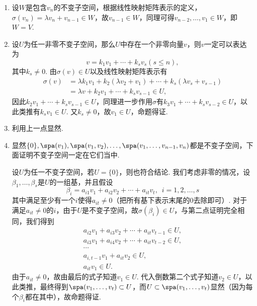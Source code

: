 \begin{solution}
    \begin{enumerate}
        \item 设$W$是包含$v_n$的不变子空间，根据线性映射矩阵表示的定义，$\sigma(v_n)=\lambda v_n+v_{n-1}\in W$，故$v_{n-1}\in W$，同理可得$v_{n-2},\ldots,v_1\in W$，即$W=V$.

        \item 设$U$为任一非零不变子空间，那么$U$中存在一个非零向量$v$，则$v$一定可以表达为
              \[v=k_1v_1+\cdots+k_sv_s(s\leqslant n),\]
              其中$k_s\neq 0$. 由$\sigma(v)\in U$以及线性映射矩阵表示有
              \begin{align*}
                  \sigma(v) & = \lambda k_1v_1+k_2(\lambda v_2+v_1)+\cdots+k_s(\lambda v_s+v_{s-1}) \\
                            & = \lambda v+k_2v_1+\cdots+k_sv_{s-1}\in U,
              \end{align*}
              因此$k_2v_1+\cdots+k_sv_{s-1}\in U$，同理进一步作用$\sigma$有$k_3v_1+\cdots+k_sv_{s-2}\in U$，以此类推有$k_sv_1\in U$. 又$k_s\neq 0$，故$v_1\in U$，命题得证.

        \item 利用上一点显然.

        \item 显然$\{0\},\spa(v_1),\spa(v_1,v_2),\ldots,\spa(v_1,\ldots,v_{n-1},v_n)$都是不变子空间，下面证明不变子空间一定在它们当中.

              设$U$为任一不变子空间，若$U=\{0\}$，则也符合结论. 我们考虑非零的情况，设$\beta_1,\ldots,\beta_s$是$U$的一组基，并且假设
              \[\beta_i=a_{i1}v_1+a_{i2}v_2+\cdots+a_{it}v_t,\enspace i=1,2,\ldots,s\]
              其中满足至少有一个$i$使得$a_{it}\neq 0$（把所有基下表示末尾的0去除即可）. 对于满足$a_{it}\neq 0$的$i$，由于$U$是不变子空间，故$\sigma(\beta_i)\in U$，与第二点证明完全相同，我们得到
              \begin{align*}
                  a_{i2}v_1+a_{i3}v_2+\cdots+a_{it}v_{t-1}\in U, \\
                  a_{i3}v_1+a_{i4}v_2+\cdots+a_{it}v_{t-2}\in U, \\
                  \cdots                                         \\
                  a_{i,t-1}v_1+a_{it}v_2\in U,                   \\
                  a_{it}v_1\in U.
              \end{align*}
              由于$a_{it}\neq 0$，故由最后的式子知道$v_1\in U$. 代入倒数第二个式子知道$v_2\in U$，以此类推，最终得到$\spa(v_1,\ldots,v_t)\subset U$，而$U\subset\spa(v_1,\ldots,v_t)$显然（因为每个$\beta_i$都在其中），故命题得证.
    \end{enumerate}
\end{solution}

